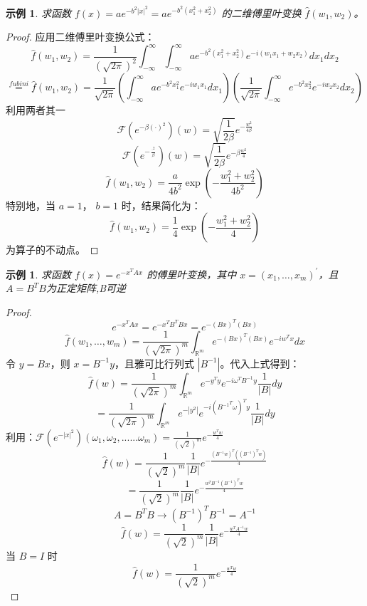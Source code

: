 \documentclass[linespread=1.5,openany]{book}%
\theoremstyle{plain}
\newtheorem{example}[theorem]{示例}
\begin{document}
{{{					\begin{example}
						求函数 \( f(x) = a e^{-b^2 |x|^2} = a e^{-b^2 (x_1^2 + x_2^2)} \) 的二维傅里叶变换 \( \hat{f}(w_1, w_2) \)。
					\end{example}
					\begin{proof}
						应用二维傅里叶变换公式：
						\[	\hat{f}(w_1, w_2) = \frac{1}{(\sqrt{2\pi})^2} \int_{-\infty}^{\infty} \int_{-\infty}^{\infty} a e^{-b^2 (x_1^2 + x_2^2)} e^{-i(w_1 x_1 + w_2 x_2)} dx_1 dx_2\]
						\[\stackrel{fubini}{=}	\hat{f}(w_1, w_2) = \frac{1}{\sqrt{2\pi}} \left( \int_{-\infty}^{\infty} a e^{-b^2 x_1^2} e^{-i w_1 x_1} dx_1 \right) \left( \frac{1}{\sqrt{2\pi}}\int_{-\infty}^{\infty} e^{-b^2 x_2^2} e^{-i w_2 x_2} dx_2 \right)\]
						利用两者其一\[\mathcal{F}(e^{-\beta (\cdot)^2})(w) = \sqrt{\frac{1}{2\beta}} e^{-\frac{w^2}{4\beta}}\]
						\[	\mathcal{F}(e^{-\frac{\cdot ^2}{\beta}})(w) = \sqrt{\frac{1}{2\beta}} e^{-\beta\frac{w^2}{4}}\]
						\[\hat{f}(w_1, w_2) = \frac{a}{4 b^2} \exp\left(-\frac{w_1^2 + w_2^2}{4 b^2}\right)\]
						特别地，当 \( a = 1 \)， \( b = 1 \) 时，结果简化为：
						\begin{equation}
							\hat{f}(w_1, w_2) = \frac{1}{4} \exp\left(-\frac{w_1^2 + w_2^2}{4}\right)
						\end{equation}为算子的不动点。
					\end{proof}
					\begin{example}
						求函数 \( f(x) = e^{-x^{T} A x} \) 的傅里叶变换，其中 \( x = (x_1, \dots, x_m)^{'} \)，且 \( A = B^{T} B \)为正定矩阵,B可逆
					\end{example}
					\begin{proof}
						\[	e^{-x^{T} A x} = e^{-x^{T} B^{T} B x} = e^{-(B x)^{T} (B x)}\]	
						\[	\hat{f}(w_1, \dots, w_m) = \frac{1}{(\sqrt{2\pi})^m} \int_{\mathbb{R}^m} e^{-(B x)^{T} (B x)} e^{-i w^{T} x} dx
						\]
						令 \( y = B x \)，则 \( x = B^{-1} y \)，且雅可比行列式 \( |B^{-1}| \)。代入上式得到：
						\[	\hat{f}(w) = \frac{1}{(\sqrt{2\pi})^m} \int_{\mathbb{R}^m} e^{-y^{T} y} e^{-i \omega^{T} B^{-1} y} \frac{1}{|B|} dy
						\]
						\[= \frac{1}{(\sqrt{2\pi})^m} \int_{\mathbb{R}^m} e^{-|y^2|} e^{-i ({B^{-1}}^{T}\omega)^T y} \frac{1}{|B|} dy\]
						利用：$\mathcal{F}(e^{-|x|^2})(\omega_1,\omega_2,......\omega_m) = \frac{1}{(\sqrt{2 })^m} e^{-\frac{w^T w}{4}}$
						\[\hat{f}(w) = \frac{1}{(\sqrt{2})^m} \frac{1}{|B|} e^{-\frac{(B^{-1} w)^T ((B^{-1})^T w)}{4}}	\]
						\[= \frac{1}{(\sqrt{2})^m} \frac{1}{|B|} e^{-\frac{w^T B^{-1}(B^{-1})^{T}  w}{4}}	\]
						\[ A = B^T B \rightarrow (B^{-1})^T B^{-1} = A^{-1} \]
						\[	\hat{f}(w) = \frac{1}{(\sqrt{2})^m} \frac{1}{|B|} e^{-\frac{w^T A^{-1} w}{4}}	\]
						当 \( B = I \) 时 
						\[
						\hat{f}(w) = \frac{1}{(\sqrt{2})^m} e^{-\frac{w^T w}{4}}
						\]
					\end{proof}
}}}
\end{document}
